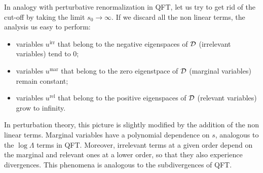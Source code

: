 \documentclass[10pt,here,feynmf]{article}
\begin{document}
In analogy with perturbative renormalization in QFT, let us try to get rid of the cut-off by taking the limit $s_{0}\rightarrow\infty$. If we discard all the non linear terms, the analysis us easy to perform: 

\begin{itemize}
\item
variables $u^{\mathrm{irr}}$ that belong to the negative eigenspaces of ${\cal D}$ (irrelevant variables) tend to $0$;
\item
variables $u^{\mathrm{mar}}$ that belong to the zero eigenstpace of ${\cal D}$ (marginal variables) remain constant;
\item
variables $u^{\mathrm{rel}}$ that belong to the positive eigenspaces of ${\cal D}$ (relevant variables) grow to infinity.
\end{itemize}

In perturbation theory, this picture is slightly modified by the addition of the non linear terms. Marginal variables have a polynomial dependence on $s$, analogous to the $\log\Lambda$ terms in QFT. Moreover, irrelevant terms at a given order depend on the marginal and relevant ones at a lower order, so that they also experience divergences. This phenomena is analogous to the subdivergences of QFT.
\end{document}
